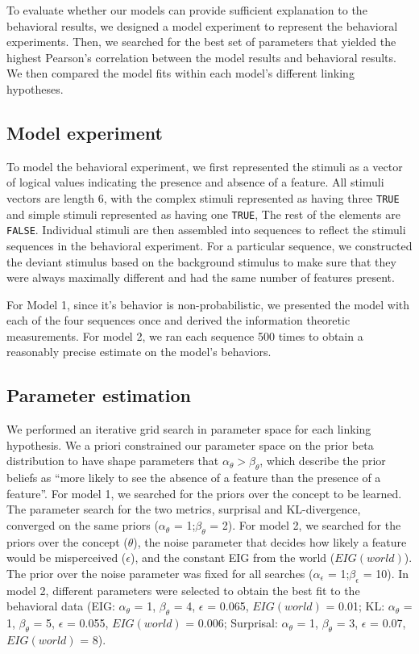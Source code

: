 \documentclass[10pt, letterpaper]{article}
\begin{document}
To evaluate whether our models can provide sufficient explanation to the
behavioral results, we designed a model experiment to represent the
behavioral experiments. Then, we searched for the best set of parameters
that yielded the highest Pearson's correlation between the model results
and behavioral results. We then compared the model fits within each
model's different linking hypotheses.

\hypertarget{model-experiment}{%
\subsection{Model experiment}\label{model-experiment}}

To model the behavioral experiment, we first represented the stimuli as
a vector of logical values indicating the presence and absence of a
feature. All stimuli vectors are length 6, with the complex stimuli
represented as having three \texttt{TRUE} and simple stimuli represented
as having one \texttt{TRUE}, The rest of the elements are
\texttt{FALSE}. Individual stimuli are then assembled into sequences to
reflect the stimuli sequences in the behavioral experiment. For a
particular sequence, we constructed the deviant stimulus based on the
background stimulus to make sure that they were always maximally
different and had the same number of features present.

For Model 1, since it's behavior is non-probabilistic, we presented the
model with each of the four sequences once and derived the information
theoretic measurements. For model 2, we ran each sequence 500 times to
obtain a reasonably precise estimate on the model's behaviors.

\hypertarget{parameter-estimation}{%
\subsection{Parameter estimation}\label{parameter-estimation}}

We performed an iterative grid search in parameter space for each
linking hypothesis. We a priori constrained our parameter space on the
prior beta distribution to have shape parameters that
\(\alpha_{\theta} > \beta_{\theta}\), which describe the prior beliefs
as ``more likely to see the absence of a feature than the presence of a
feature''. For model 1, we searched for the priors over the concept to
be learned. The parameter search for the two metrics, surprisal and
KL-divergence, converged on the same priors (\(\alpha_{\theta}\) =
1;\(\beta_{\theta}\) = 2). For model 2, we searched for the priors over
the concept (\(\theta\)), the noise parameter that decides how likely a
feature would be misperceived (\(\epsilon\)), and the constant EIG from
the world (\(EIG(world)\)). The prior over the noise parameter was fixed
for all searches (\(\alpha_{\epsilon}\) = 1;\(\beta_{\epsilon}\) = 10).
In model 2, different parameters were selected to obtain the best fit to
the behavioral data (EIG: \(\alpha_{\theta}\) = 1, \(\beta_{\theta}\) =
4, \(\epsilon\) = 0.065, \(EIG(world)\) = 0.01; KL: \(\alpha_{\theta}\)
= 1, \(\beta_{\theta}\) = 5, \(\epsilon\) = 0.055, \(EIG(world)\) =
0.006; Surprisal: \(\alpha_{\theta}\) = 1, \(\beta_{\theta}\) = 3,
\(\epsilon\) = 0.07, \(EIG(world)\) = 8).
\end{document}
